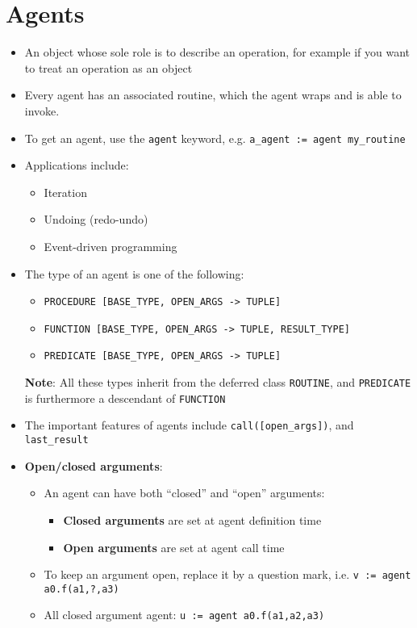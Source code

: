 \documentclass[a4paper]{article}
\newcommand{\inline}[1]{\lstinline!#1!}%
\begin{document}
\section{Agents}
\begin{itemize}
\item An object whose sole role is to describe an operation, for example if you want to treat an operation as an object
\item Every agent has an associated routine, which the agent wraps and is able to invoke.
\item To get an agent, use the \inline{agent} keyword, e.g. \inline{a_agent := agent my_routine}
\item Applications include:
\begin{itemize}
\item Iteration
\item Undoing (redo-undo)
\item Event-driven programming
\end{itemize}
\item The type of an agent is one of the following:
\begin{itemize}
\item \inline{PROCEDURE [BASE_TYPE, OPEN_ARGS -> TUPLE]}
\item \inline{FUNCTION [BASE_TYPE, OPEN_ARGS -> TUPLE, RESULT_TYPE]}
\item \inline{PREDICATE [BASE_TYPE, OPEN_ARGS -> TUPLE]}
\end{itemize}
\textbf{Note}: All these types inherit from the deferred class \inline{ROUTINE}, and \inline{PREDICATE} is furthermore a descendant of \inline{FUNCTION}
\item The important features of agents include \inline{call([open_args])}, and \inline{last_result}
\item \textbf{Open/closed arguments}: 
\begin{itemize}
\item An agent can have both ``closed'' and ``open'' arguments:
\begin{itemize}
\item \textbf{Closed arguments} are set at agent definition time
\item \textbf{Open arguments} are set at agent call time
\end{itemize}
\item To keep an argument open, replace it by a question mark, i.e. \inline{v := agent a0.f(a1,?,a3)}
\item All closed argument agent: \inline{u := agent a0.f(a1,a2,a3)}

\end{itemize}
\end{itemize}
\end{document}
